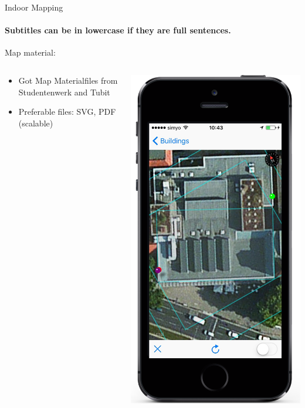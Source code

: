 \documentclass[11pt]{beamer}
\begin{document}
\begin{frame}{Indoor Mapping}

\framesubtitle{Subtitles can be in lowercase if they are full sentences.}
Map material:

  \begin{columns}[T]
  \begin{column}{.6\textwidth}
  \begin{itemize}
    \item Got Map Materialfiles from Studentenwerk and Tubit
    \item Preferable files: SVG, PDF (scalable)
  \end{itemize}
  \end{column}
  \begin{column}{.4\textwidth}
  \includegraphics[scale=0.25]{mapfirststep}
  \end{column}
\end{columns}

\end{frame}
\end{document}

